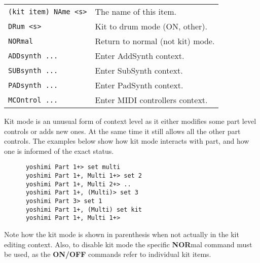 \begin{center}
\begin{longtable}[l]{ ll}
   \texttt{(kit item) NAme <s>} &
      The name of this item. \\
    \texttt{DRum <s>} &
      Kit to drum mode (ON, {other}). \\
    \texttt{NORmal} &
      Return to normal (not kit) mode. \\
\texttt{ADDsynth ...} &
   Enter AddSynth context. \\
\texttt{SUBsynth ...} &
   Enter SubSynth context. \\
\texttt{PADsynth ...} &
   Enter PadSynth context. \\
\texttt{MCOntrol ...} &
   Enter MIDI controllers context. \\
\end{longtable}
\end{center}

   Kit mode is an unusual form of context level as it either modifies some
   part level controls or adds new ones. At the same time it still allows all
   the other part controls. The examples below show how kit mode interacts
   with part, and how one is informed of the exact status.

   \begin{verbatim}
      yoshimi Part 1+> set multi
      yoshimi Part 1+, Multi 1+> set 2
      yoshimi Part 1+, Multi 2+> ..
      yoshimi Part 1+, (Multi)> set 3
      yoshimi Part 3> set 1
      yoshimi Part 1+, (Multi) set kit
      yoshimi Part 1+, Multi 1+>
   \end{verbatim}

   Note how the kit mode is shown in parenthesis when not actually in the kit
   editing context. Also, to disable kit mode the specific \textbf{NOR}mal
   command must be used, as the \textbf{ON/OFF} commands refer to individual
   kit items.


